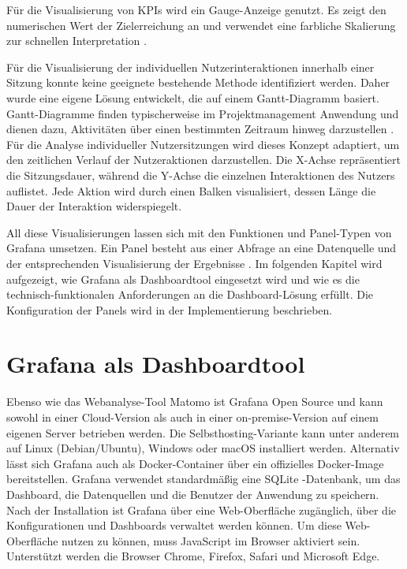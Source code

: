Für die Visualisierung von KPIs wird ein Gauge-Anzeige genutzt. Es zeigt den numerischen Wert der Zielerreichung an und verwendet eine farbliche Skalierung zur schnellen Interpretation \parencite{GrafanaGauge}.

Für die Visualisierung der individuellen Nutzerinteraktionen innerhalb einer Sitzung konnte keine geeignete bestehende Methode identifiziert werden. Daher wurde eine eigene Lösung entwickelt, die auf einem Gantt-Diagramm basiert. Gantt-Diagramme finden typischerweise im Projektmanagement Anwendung und dienen dazu, Aktivitäten über einen bestimmten Zeitraum hinweg darzustellen \parencite{GanttCom}. Für die Analyse individueller Nutzersitzungen wird dieses Konzept adaptiert, um den zeitlichen Verlauf der Nutzeraktionen darzustellen. Die X-Achse repräsentiert die Sitzungsdauer, während die Y-Achse die einzelnen Interaktionen des Nutzers auflistet. Jede Aktion wird durch einen Balken visualisiert, dessen Länge die Dauer der Interaktion widerspiegelt.

All diese Visualisierungen lassen sich mit den Funktionen und Panel-Typen von Grafana umsetzen. Ein Panel besteht aus einer Abfrage an eine Datenquelle und der entsprechenden Visualisierung der Ergebnisse \parencite{GrafanaPanel}. Im folgenden Kapitel wird aufgezeigt, wie Grafana als Dashboardtool eingesetzt wird und wie es die technisch-funktionalen Anforderungen an die Dashboard-Lösung erfüllt. Die Konfiguration der Panels wird in der Implementierung beschrieben. 

\section{Grafana als Dashboardtool}
Ebenso wie das Webanalyse-Tool Matomo ist Grafana Open Source und kann sowohl in einer Cloud-Version als auch in einer on-premise-Version auf einem eigenen Server betrieben werden. Die Selbsthosting-Variante kann unter anderem auf Linux (Debian/Ubuntu), Windows oder macOS installiert werden. Alternativ lässt sich Grafana auch als Docker-Container über ein offizielles Docker-Image bereitstellen. Grafana verwendet standardmäßig eine SQLite -Datenbank, um das Dashboard, die Datenquellen und die Benutzer der Anwendung zu speichern. Nach der Installation ist Grafana über eine Web-Oberfläche zugänglich, über die Konfigurationen und Dashboards verwaltet werden können. Um diese Web-Oberfläche nutzen zu können, muss JavaScript im Browser aktiviert sein. Unterstützt werden die Browser Chrome, Firefox, Safari und Microsoft Edge. \parencite{GrafanaLabsInstall}

